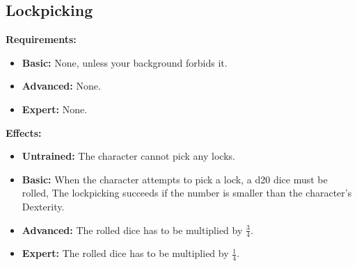 \subsection{Lockpicking}
\begin{table}[!ht]
\centering
{}
\end{table}
\textbf{Requirements:}
\begin{itemize}
	\item \textbf{Basic:} None, unless your background forbids it.
	\item \textbf{Advanced:} None.
	\item \textbf{Expert:} None.
\end{itemize}
\textbf{Effects:}
\begin{itemize}
	\item \textbf{Untrained:} The character cannot pick any locks.
	\item \textbf{Basic:} When the character attempts to pick a lock, a d20 dice  must be rolled, The lockpicking succeeds if the number is smaller than the character's Dexterity. 
	\item \textbf{Advanced:} The rolled dice has to be multiplied by \( \frac{3}{4} \).
	\item \textbf{Expert:} The rolled dice has to be multiplied by \( \frac{1}{4} \).
\end{itemize}\newpage
